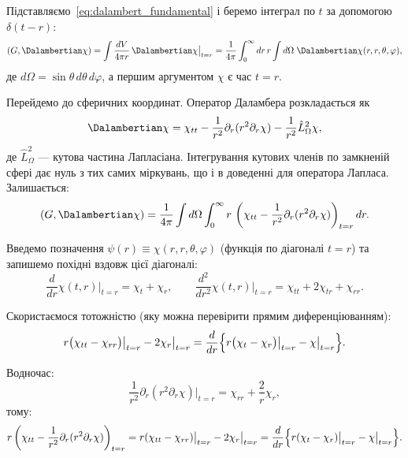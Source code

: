 Підставляємо~\eqref{eq:dalambert_fundamental} і беремо інтеграл по \( t \)
за допомогою \( \delta(t-r) \):
\begin{equation*}
    (G, \Dalambertian \chi)
    = \int \frac{dV}{4\pi r}\, \Dalambertian \chi \big|_{t=r}
    = \frac{1}{4\pi} \int_0^\infty dr\, r \int d\Omega\;
      \Dalambertian \chi(r, r,\theta,\varphi),
\end{equation*}
де \( d\Omega = \sin\theta\,d\theta\,d\varphi \), а першим аргументом \( \chi \) є час \( t = r \).

Перейдемо до сферичних координат. Оператор Даламбера розкладається як
\begin{equation*}
    \Dalambertian \chi = \chi_{tt} - \frac{1}{r^2}\partial_r(r^2 \partial_r \chi)
    - \frac{1}{r^2}\hat{L}^2_\Omega \chi,
\end{equation*}
де \( \hat{L}^2_\Omega \) --- кутова частина Лапласіана. Інтегрування кутових членів по замкненій сфері дає нуль з тих самих міркувань, що і в доведенні
для оператора Лапласа. Залишається:
\begin{equation*}
    (G, \Dalambertian \chi)
    = \frac{1}{4\pi}\int d\Omega \int_0^\infty r\,
      \left(\chi_{tt} - \frac{1}{r^2}\partial_r(r^2\partial_r \chi)\right)_{t=r} dr.
\end{equation*}

Введемо позначення \( \psi(r) \equiv \chi(r, r,\theta,\varphi) \) (функція по діагоналі \( t = r \)) та запишемо похідні вздовж цієї діагоналі:
\begin{equation*}
    \frac{d}{dr}\chi(t,r)\big|_{t=r} = \chi_t + \chi_r, \qquad
    \frac{d^2}{dr^2}\chi(t,r)\big|_{t=r} = \chi_{tt} + 2\chi_{tr} + \chi_{rr}.
\end{equation*}

Скористаємося тотожністю (яку можна перевірити прямим диференціюванням):
\begin{equation}
    r\bigl(\chi_{tt} - \chi_{rr}\bigr)\big|_{t=r} - 2\chi_r\big|_{t=r}
    = \frac{d}{dr}\Bigl\{ r\bigl(\chi_t - \chi_r\bigr)\big|_{t=r} - \chi\big|_{t=r} \Bigr\}.
    \label{eq:dalambert_identity}
\end{equation}

Водночас:
\begin{equation*}
    \frac{1}{r^2}\partial_r(r^2\partial_r \chi)\big|_{t=r}
    = \chi_{rr} + \frac{2}{r}\chi_r,
\end{equation*}
тому:
\begin{equation*}
    r\left(\chi_{tt} - \frac{1}{r^2}\partial_r(r^2\partial_r\chi)\right)_{t=r}
    = r(\chi_{tt} - \chi_{rr})\big|_{t=r} - 2\chi_r\big|_{t=r}
    = \frac{d}{dr}\Bigl\{ r(\chi_t - \chi_r)\big|_{t=r} - \chi\big|_{t=r} \Bigr\}.
\end{equation*}

